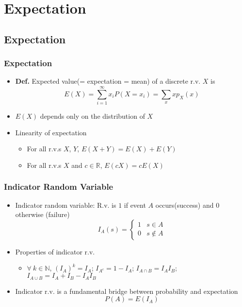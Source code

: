 \section{Expectation}

\subsection{Expectation}

\subsubsection*{Expectation}
\begin{itemize}
    \item \textbf{Def.} Expected value(= expectation = mean) of a discrete r.v. $X$ is
    \begin{equation}
        E(X)=\sum_{i=1}^\infty x_iP(X=x_i)=\sum_{x}xp_X(x)
    \end{equation}
    \item $E(X)$ depends only on the distribution of $X$
    \item Linearity of expectation
    \begin{itemize}
        \item For all r.v.s $X$, $Y$, $E(X+Y)=E(X)+E(Y)$
        \item For all r.v.s $X$ and $c\in\mathbb{R}$, $E(cX)=cE(X)$
    \end{itemize}
\end{itemize}

\subsubsection*{Indicator Random Variable}
\begin{itemize}
    \item Indicator random variable: R.v. is $1$ if event $A$ occurs(success) and $0$ otherwise (failure)
    \begin{equation}
        I_A(s)=\begin{cases}
            1 & s\in A\\
            0 & s\notin A
        \end{cases}
    \end{equation}
    \item Properties of indicator r.v.
    \begin{itemize}
        \item $\forall~k\in\mathbb{N}$, $(I_A)^k=I_A$; $I_{A^c}=1-I_A$; $I_{A\cap B}=I_AI_B$; $I_{A\cup B}=I_A+I_B-I_AI_B$
    \end{itemize}
    \item Indicator r.v. is a fundamental bridge between probability and expectation
    \begin{equation}
        P(A)=E(I_A)
    \end{equation}
\end{itemize}

